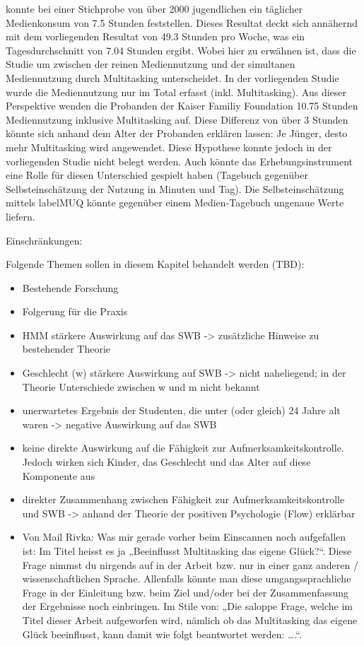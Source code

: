  konnte bei einer Stichprobe von über 2000 jugendlichen ein täglicher Medienkonsum von 7.5 Stunden feststellen. Dieses Resultat deckt sich annähernd mit dem vorliegenden Resultat von 49.3 Stunden pro Woche, was ein Tagesdurchschnitt von 7.04 Stunden ergibt. Wobei hier zu erwähnen ist, dass die Studie um  zwischen der reinen Mediennutzung und der simultanen Mediennutzung durch Multitasking unterscheidet. In der vorliegenden Studie wurde die Mediennutzung nur im Total erfasst (inkl. Multitasking). Aus dieser Perspektive wenden die Probanden der Kaiser Familiy Foundation 10.75 Stunden Mediennutzung inklusive Multitasking auf. Diese Differenz von über 3 Stunden könnte sich anhand dem Alter der Probanden erklären lassen: Je Jünger, desto mehr Multitasking wird angewendet. Diese Hypothese konnte jedoch in der vorliegenden Studie nicht belegt werden. Auch könnte das Erhebungsinstrument eine Rolle für diesen Unterschied gespielt haben (Tagebuch gegenüber Selbsteinschätzung der Nutzung in Minuten und Tag). Die Selbsteinschätzung mittels \gls{labelMUQ} könnte gegenüber einem Medien-Tagebuch ungenaue Werte liefern.\\
\par
Einschränkungen: 

Folgende Themen sollen in diesem Kapitel behandelt werden (TBD):
\begin{itemize}
    \item Bestehende Forschung
    \item Folgerung für die Praxis
    \item HMM stärkere Auswirkung auf das SWB -> zusätzliche Hinweise zu bestehender Theorie
    \item Geschlecht (w) stärkere Auswirkung auf SWB -> nicht naheliegend; in der Theorie Unterschiede zwischen w und m nicht bekannt
    \item unerwartetes Ergebnis der Studenten, die unter (oder gleich) 24 Jahre alt waren -> negative Auswirkung auf das SWB
    \item keine direkte Auswirkung auf die Fähigkeit zur Aufmerksamkeitskontrolle. Jedoch wirken sich Kinder, das Geschlecht und das Alter auf diese Komponente aus
    \item direkter Zusammenhang zwischen Fähigkeit zur Aufmerksamkeitskontrolle und SWB -> anhand der Theorie der positiven Psychologie (Flow) erklärbar
    \item Von Mail Rivka: Was mir gerade vorher beim Einscannen noch aufgefallen ist: Im Titel heisst es ja „Beeinflusst Multitasking das eigene Glück?“. Diese Frage nimmst du nirgends auf in der Arbeit bzw. nur in einer ganz anderen / wissenschaftlichen Sprache. Allenfalls könnte man diese umgangssprachliche Frage in der Einleitung bzw. beim Ziel und/oder bei der Zusammenfassung der Ergebnisse noch einbringen. Im Stile von: „Die saloppe Frage, welche im Titel dieser Arbeit aufgeworfen wird, nämlich ob das Multitasking das eigene Glück beeinflusst, kann damit wie folgt beantwortet werden: ….“.
\end{itemize}

